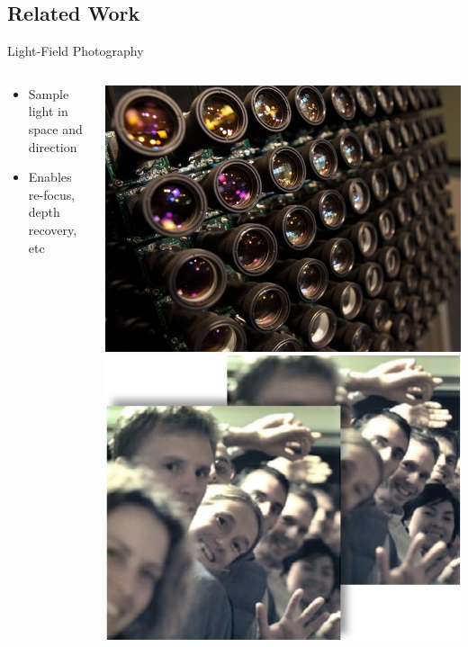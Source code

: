 \documentclass[compress,red,12pt]{beamer}
\begin{document}

\subsection{Related Work}

\begin{frame}{Light-Field Photography}
  \begin{columns}[T]
    \begin{column}{.7\textwidth}
      \begin{itemize}
      \item Sample light in space and direction
      \item Enables re-focus, depth recovery, etc
      \end{itemize}
    \end{column}
    \begin{column}{.3\textwidth}
      \centering
      \includegraphics[height=0.30\textheight]{stanford_camera_array_640x480.jpg}
      \includegraphics[height=0.30\textheight]{lytro.jpg}
    \end{column}
  \end{columns}
\end{frame}
\end{document}
